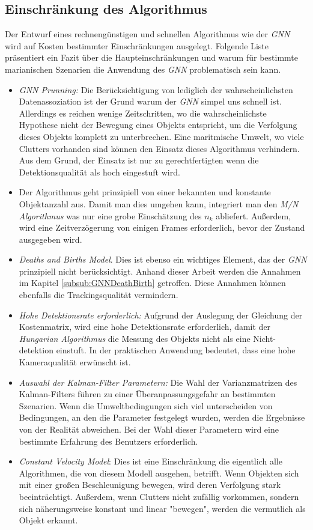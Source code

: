 \documentclass[10pt,a4paper]{article}
\begin{document}
\subsection{Einschränkung des Algorithmus}
Der Entwurf eines rechnengünstigen und schnellen Algorithmus wie der \textit{GNN} wird auf Kosten bestimmter Einschränkungen ausgelegt. Folgende Liste präsentiert ein Fazit über die Haupteinschränkungen und warum für bestimmte marianischen Szenarien die Anwendung des \textit{GNN} problematisch sein kann.\\
\begin{itemize}
  \item \textit{GNN Prunning:} Die Berücksichtigung von lediglich der wahrscheinlichsten Datenassoziation ist der Grund warum der \textit{GNN} simpel uns schnell ist. Allerdings es reichen wenige Zeitschritten, wo die wahrscheinlichste Hypothese nicht der Bewegung eines Objekts entspricht, um die Verfolgung dieses Objekts komplett zu unterbrechen. Eine maritmische Umwelt, wo viele Clutters vorhanden sind können den Einsatz dieses Algorithmus verhindern. Aus dem Grund, der Einsatz ist nur zu gerechtfertigten wenn die Detektionsqualität als hoch eingestuft wird.
  \item Der Algorithmus geht prinzipiell von einer bekannten und konstante Objektanzahl aus. Damit man dies umgehen kann, integriert man den \textit{M/N Algorithmus} was nur eine grobe Einschätzung des $n_k$ abliefert. Außerdem, wird eine Zeitverzögerung von einigen Frames erforderlich, bevor der Zustand ausgegeben wird.
 \item \textit{Deaths and Births Model}. Dies ist ebenso ein wichtiges Element, das der \textit{GNN} prinzipiell nicht berücksichtigt. Anhand dieser Arbeit werden die Annahmen im Kapitel \ref{subsub:GNNDeathBirth} getroffen. Diese Annahmen können ebenfalls die Trackingsqualität vermindern.
  \item \textit{Hohe Detektionsrate erforderlich:} Aufgrund der Auslegung der Gleichung der Kostenmatrix, wird eine hohe Detektionsrate erforderlich, damit der \textit{Hungarian Algorithmus} die Messung des Objekts nicht als eine Nicht-detektion einstuft. In der praktischen Anwendung bedeutet, dass eine hohe Kameraqualität erwünscht ist.
  \item \textit{Auswahl der Kalman-Filter Parametern:} Die Wahl der Varianzmatrizen des Kalman-Filters führen zu einer Überanpassungsgefahr an bestimmten Szenarien. Wenn die Umweltbedingungen sich viel unterscheiden von Bedingungen, an den die Parameter festgelegt wurden, werden die Ergebnisse von der Realität abweichen. Bei der Wahl dieser Parametern wird eine bestimmte Erfahrung des Benutzers erforderlich.
  \item \textit{Constant Velocity Model}: Dies ist eine Einschränkung die eigentlich alle Algorithmen, die von diesem Modell ausgehen, betrifft. Wenn Objekten sich mit einer großen Beschleunigung bewegen, wird deren Verfolgung stark beeinträchtigt. Außerdem, wenn Clutters nicht zufällig vorkommen, sondern sich näherungsweise konstant und linear "bewegen", werden die vermutlich als Objekt erkannt. 
\end{itemize}


\newpage


\end{document}
